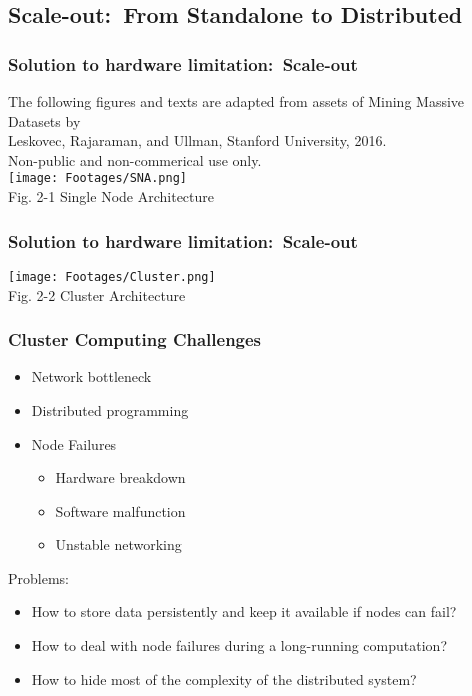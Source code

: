 \documentclass{beamer}
\begin{document}
\subsection{Scale-out:\ From Standalone to Distributed}
\begin{frame}
\frametitle{Solution to hardware limitation:\ Scale-out}
\begin{center}
  \tiny \color{gray} The following figures and texts are adapted from assets of Mining Massive Datasets by\\
  Leskovec, Rajaraman, and Ullman, Stanford University, 2016.\\
   Non-public and non-commerical use only.\\
  \texttt{[image: Footages/SNA.png]} \\
  \scriptsize \color{black} Fig. 2-1 Single Node Architecture
\end{center}
\end{frame}
\begin{frame}
\frametitle{Solution to hardware limitation:\ Scale-out}
\begin{center}
  \texttt{[image: Footages/Cluster.png]} \\
  \scriptsize Fig. 2-2 Cluster Architecture
\end{center}
\end{frame}
\begin{frame} \small
\frametitle{Cluster Computing Challenges}
\begin{itemize}
  \item Network bottleneck
  \item Distributed programming
  \item Node Failures
  \begin{itemize}
    \item Hardware breakdown
    \item Software malfunction
    \item Unstable networking
  \end{itemize}
\end{itemize}
Problems:
\begin{itemize}
\item How to store data persistently and keep it available if nodes can fail?
\item How to deal with node failures during a long-running computation?
\item How to hide most of the complexity of the distributed system?
\end{itemize}
\end{frame}
\end{document}
